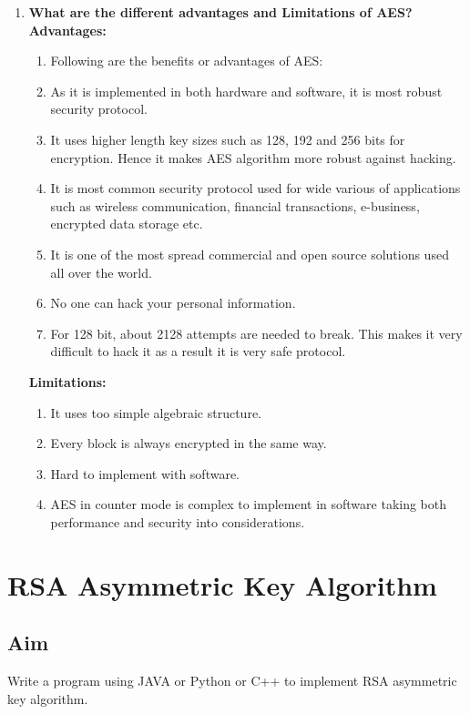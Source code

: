 \documentclass[openany]{book}
\begin{document}
\begin{enumerate}
	\item \textbf{What are the different advantages and Limitations of AES?}\\
	      \textbf{Advantages: }\\
	      \begin{enumerate}
		      \item Following are the benefits or advantages of AES:
		      \item As it is implemented in both hardware and software, it is most robust security protocol.
		      \item It uses higher length key sizes such as 128, 192 and 256 bits for encryption. Hence it makes AES algorithm more robust against hacking.
		      \item It is most common security protocol used for wide various of applications such as wireless communication, financial transactions, e-business, encrypted data storage etc.
		      \item It is one of the most spread commercial and open source solutions used all over the world.
		      \item No one can hack your personal information.
		      \item For 128 bit, about 2128 attempts are needed to break. This makes it very difficult to hack it as a result it is very safe protocol.
	      \end{enumerate}


	      \textbf{Limitations: }\\
	      \begin{enumerate}
		      \item It uses too simple algebraic structure.
		      \item Every block is always encrypted in the same way.
		      \item Hard to implement with software.
		      \item AES in counter mode is complex to implement in software taking both performance and security into considerations.
	      \end{enumerate}

\end{enumerate}



\chapter{RSA Asymmetric Key Algorithm}
\section{Aim}
Write a program using JAVA or Python or C++ to implement RSA asymmetric key
algorithm.
\end{document}
